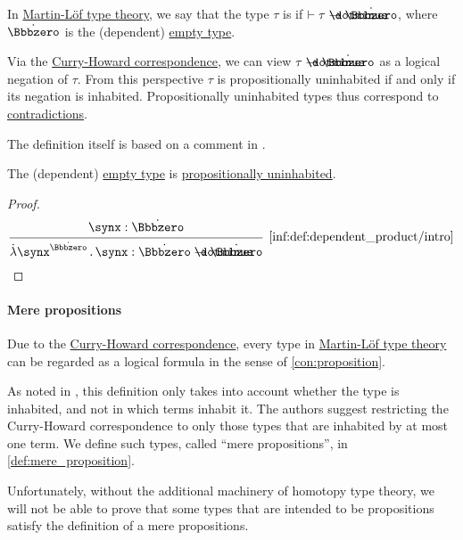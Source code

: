 \begin{definition}\label{def:propositionally_uninhabited}\mimprovised
  In \hyperref[def:mltt]{Martin-L\"of type theory}, we say that the type \( \tau \) is  if \( \vdash \tau \synimplies \syn\Bbbzero \), where \( \syn\Bbbzero \) is the (dependent) \hyperref[def:dependent_empty_type]{empty type}.
\end{definition}
\begin{comments}
  \item Via the \hyperref[con:curry_howard_correspondence]{Curry-Howard correspondence}, we can view \( \tau \synimplies \syn\Bbbzero \) as a logical negation of \( \tau \). From this perspective \( \tau \) is propositionally uninhabited if and only if its negation is inhabited. Propositionally uninhabited types thus correspond to \hyperref[def:propositional_contradiction]{contradictions}.

  The definition itself is based on a comment in \cite[47]{UnivalentFoundationsProgram2013HoTT}.
\end{comments}

\begin{proposition}\label{thm:empty_type_is_uninhabited}
  The (dependent) \hyperref[def:dependent_empty_type]{empty type} is \hyperref[def:propositionally_uninhabited]{propositionally uninhabited}.
\end{proposition}
\begin{proof}
  \begin{equation*}
    \begin{prooftree}
      \hypo{ \synx: \syn\Bbbzero }
      \infer1[\ref{inf:def:dependent_product/intro}]{ \qabs {\synx^{\syn\Bbbzero}} \synx: \syn\Bbbzero \synimplies \syn\Bbbzero }.
    \end{prooftree}
  \end{equation*}
\end{proof}

\paragraph{Mere propositions}

\begin{remark}\label{rem:mere_propositions}
  Due to the \hyperref[con:curry_howard_correspondence]{Curry-Howard correspondence}, every type in \hyperref[def:mltt]{Martin-L\"of type theory} can be regarded as a logical formula in the sense of \cref{con:proposition}.

  As noted in \cite[111]{UnivalentFoundationsProgram2013HoTT}, this definition only takes into account whether the type is inhabited, and not in which terms inhabit it. The authors suggest restricting the Curry-Howard correspondence to only those types that are inhabited by at most one term. We define such types, called \enquote{mere propositions}, in \cref{def:mere_proposition}.

  Unfortunately, without the additional machinery of homotopy type theory, we will not be able to prove that some types that are intended to be propositions satisfy the definition of a mere propositions.
\end{remark}

